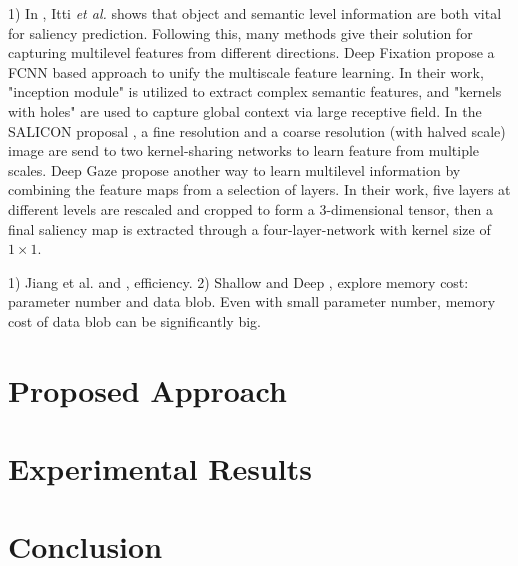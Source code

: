 \documentclass[twoside,twocolumn]{article}
\begin{document}
\par 1) In \cite{itti2001computational}, Itti \emph{et al.} shows that object and semantic level information are both vital for saliency prediction. Following this, many methods give their solution for capturing multilevel features from different directions. Deep Fixation \cite{kruthiventi2015deepfix} propose a FCNN based approach to unify the multiscale feature learning. In their work, "inception module" is utilized to extract complex semantic features, and "kernels with holes" are used to capture global context via large receptive field. In the SALICON proposal \cite{jiang2015salicon}, a fine resolution and a coarse resolution (with halved scale) image are send to two kernel-sharing networks to learn feature from multiple scales. Deep Gaze \cite{kummerer2014deep} propose another way to learn multilevel information by combining the feature maps from a selection of layers. In their work, five layers at different levels are rescaled and cropped to form a 3-dimensional tensor, then a final saliency map is extracted through a four-layer-network with kernel size of $1\times1$.

\par 1) Jiang et al. and \cite{cbmmsaliency}, efficiency. 2) Shallow and Deep \cite{pan2016shallow}, explore memory cost: parameter number and data blob. Even with small parameter number, memory cost of data blob can be significantly big. 

\section{Proposed Approach}

\section{Experimental Results}

\section{Conclusion}



\end{document}
